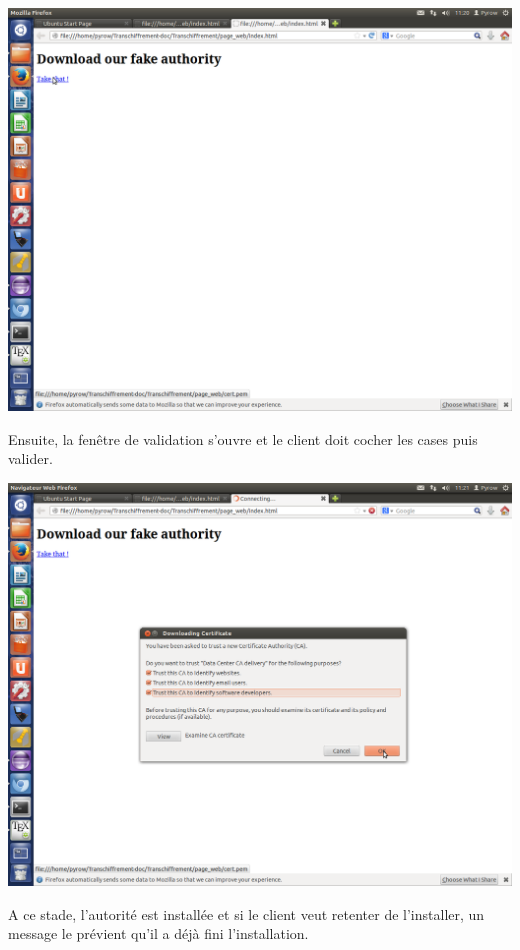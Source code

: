 \documentclass[a4paper,11pt,french]{book}
\begin{document}
\includegraphics[width=\textwidth]{images/Page.png} 
\newpage

Ensuite, la fenêtre de validation s'ouvre et le client doit cocher les cases puis valider.

\includegraphics[width=\textwidth]{images/Cert.png} 
\newpage

A ce stade, l'autorité est installée et si le client veut retenter de l'installer, un message le prévient qu'il a déjà fini l'installation.
\end{document}
